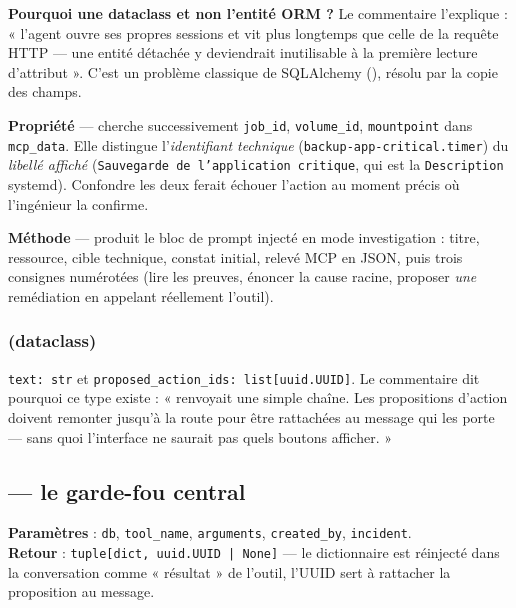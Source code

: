 \begin{keybox}
\textbf{Pourquoi une dataclass et non l'entité ORM ?} Le commentaire l'explique :
« l'agent ouvre ses propres sessions et vit plus longtemps que celle de la
requête HTTP --- une entité détachée y deviendrait inutilisable à la première
lecture d'attribut ». C'est un problème classique de SQLAlchemy
(), résolu par la copie des champs.
\end{keybox}

\noindent
\textbf{Propriété } --- cherche successivement
\texttt{job\_id}, \texttt{volume\_id}, \texttt{mountpoint} dans
\texttt{mcp\_data}. Elle distingue l'\emph{identifiant technique}
(\texttt{backup-app-critical.timer}) du \emph{libellé affiché}
(\texttt{Sauvegarde de l'application critique}, qui est la \texttt{Description}
systemd). Confondre les deux ferait échouer l'action au moment précis où
l'ingénieur la confirme.

\noindent
\textbf{Méthode } --- produit le bloc de prompt injecté en
mode investigation : titre, ressource, cible technique, constat initial, relevé
MCP en JSON, puis trois consignes numérotées (lire les preuves, énoncer la cause
racine, proposer \emph{une} remédiation en appelant réellement l'outil).

\subsubsection*{ (dataclass)}
\texttt{text: str} et \texttt{proposed\_action\_ids: list[uuid.UUID]}. Le
commentaire dit pourquoi ce type existe : «  renvoyait une
simple chaîne. Les propositions d'action doivent remonter jusqu'à la route pour
être rattachées au message qui les porte --- sans quoi l'interface ne saurait
pas quels boutons afficher. »

\subsection{ --- le garde-fou central}

\textbf{Paramètres} : \texttt{db}, \texttt{tool\_name}, \texttt{arguments},
\texttt{created\_by}, \texttt{incident}.\\
\textbf{Retour} : \texttt{tuple[dict, uuid.UUID | None]} --- le dictionnaire est
réinjecté dans la conversation comme « résultat » de l'outil, l'UUID sert à
rattacher la proposition au message.

